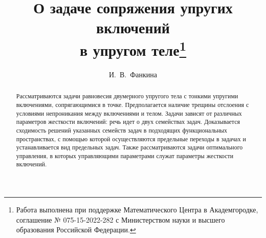 \usepackage{todonotes}

\usepackage[russian]{nla}


\fi

\title{О задаче сопряжения упругих включений \\в упругом теле\thanks{Работа выполнена при поддержке Математического Центра в Академгородке, соглашение № 075-15-2022-282 с Министерством науки и высшего образования Российской Федерации.}}
\author{И.~В.~Фанкина%
}


\maketitle

\begin{abstract}
Рассматриваются задачи равновесия двумерного упругого тела с тонкими упругими включениями, сопрягающимися в точке. Предполагается наличие трещины отслоения с условиями непроникания между включениями и телом. Задачи зависят от различных параметров жесткости включений: речь идет о двух семействах задач. Доказывается сходимость решений указанных семейств задач в подходящих функциональных пространствах, с помощью которой осуществляются предельные переходы в задачах и устанавливается вид предельных задач. Также рассматриваются задачи оптимального управления,  в которых управляющими параметрами служат параметры жесткости включений.


\end{abstract}


